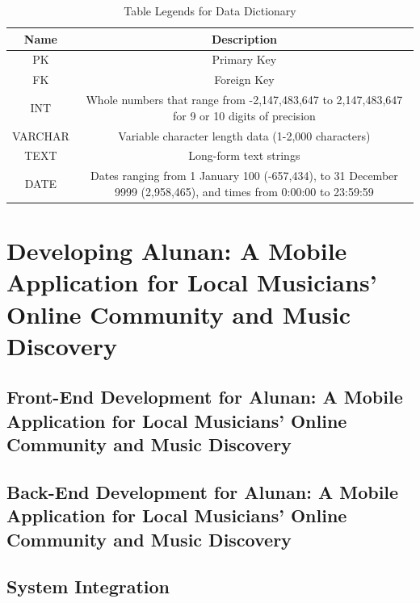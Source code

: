 \begin{enumerate}[A.]
\begin{landscape}
    \begin{table}[h]
        \centering
        \captionsetup{justification=centering} %
        \caption{Table Legends for Data Dictionary}
        \begin{tabular}{|c|c|}
        \hline
        \textbf{Name} & \textbf{Description} \\
        \hline
        PK & Primary Key \\
        \hline
        FK & Foreign Key \\
        \hline
        INT & Whole numbers that range from -2,147,483,647 to 2,147,483,647 for 9 or 10 digits of precision \\
        \hline
        VARCHAR & Variable character length data (1-2,000 characters) \\
        \hline
        TEXT & Long-form text strings \\
        \hline
        DATE & Dates ranging from 1 January 100 (-657,434), to 31 December 9999 (2,958,465), and times from 0:00:00 to 23:59:59 \\
        \hline
        \end{tabular}
    \end{table}

    \end{landscape}
\end{enumerate}

\section{Developing Alunan: A Mobile Application for Local Musicians’ Online Community and Music Discovery}
\subsection{Front-End Development for Alunan: A Mobile Application for Local Musicians’ Online Community and Music Discovery}

\subsection{Back-End Development for Alunan: A Mobile Application for Local Musicians’ Online Community and Music Discovery}

\subsection{System Integration}

